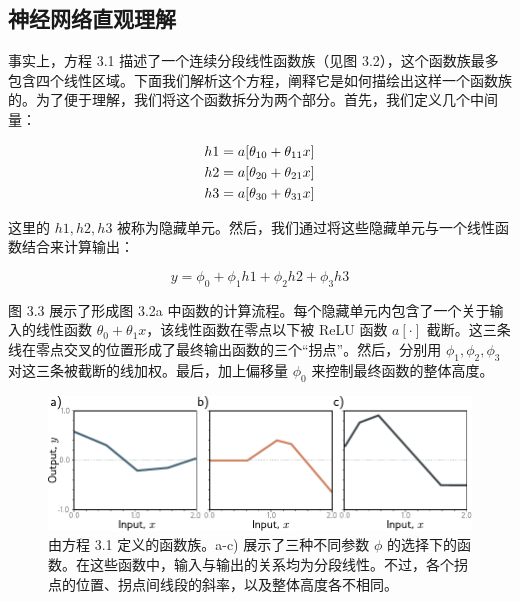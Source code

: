 \documentclass[lang=cn,newtx,10pt,scheme=chinese]{elegantbook}
\begin{document}
\subsection{神经网络直观理解}
事实上，方程 3.1 描述了一个连续分段线性函数族（见图 3.2），这个函数族最多包含四个线性区域。下面我们解析这个方程，阐释它是如何描绘出这样一个函数族的。为了便于理解，我们将这个函数拆分为两个部分。首先，我们定义几个中间量：


\begin{align}
	h1 = a[\theta_{10} + \theta_{11}x] \notag \\
	h2 = a[\theta_{20} + \theta_{21}x] \notag \\
	h3 = a[\theta_{30} + \theta_{31}x]  
\end{align} 

这里的 \(h1, h2, h3\) 被称为隐藏单元。然后，我们通过将这些隐藏单元与一个线性函数结合来计算输出：

\begin{equation}
y = \phi_0 + \phi_1h1 + \phi_2h2 + \phi_3h3 
\end{equation}

图 3.3 展示了形成图 3.2a 中函数的计算流程。每个隐藏单元内包含了一个关于输入的线性函数 \(\theta_0 + \theta_1x\)，该线性函数在零点以下被 ReLU 函数 \(a[\cdot]\) 截断。这三条线在零点交叉的位置形成了最终输出函数的三个“拐点”。然后，分别用 \(\phi_1, \phi_2, \phi_3\) 对这三条被截断的线加权。最后，加上偏移量 \(\phi_0\) 来控制最终函数的整体高度。

\begin{figure}[ht!]
	\centering
	\includegraphics[width=0.7\linewidth]{PDFFigures/UDLChap3PDF/ShallowFunctions.pdf}
\caption{由方程 3.1 定义的函数族。a-c) 展示了三种不同参数 \(\phi\) 的选择下的函数。在这些函数中，输入与输出的关系均为分段线性。不过，各个拐点的位置、拐点间线段的斜率，以及整体高度各不相同。}
\end{figure}
\end{document}

